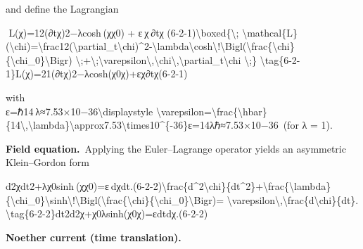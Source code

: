 \documentclass[
]{article}
\begin{document}
and define the Lagrangian

  L(χ)=12(∂tχ)2−λcosh⁡ ⁣(χχ0)  +  ε χ ∂tχ  (6-2-1)\textbackslash boxed\{\textbackslash;
\textbackslash mathcal\{L\}(\textbackslash chi)=\textbackslash frac12(\textbackslash partial\_t\textbackslash chi)\^{}2-\textbackslash lambda\textbackslash cosh\textbackslash!\textbackslash Bigl(\textbackslash frac\{\textbackslash chi\}\{\textbackslash chi\_0\}\textbackslash Bigr)
\textbackslash;+\textbackslash;\textbackslash varepsilon\textbackslash,\textbackslash chi\textbackslash,\textbackslash partial\_t\textbackslash chi
\textbackslash;\}
\textbackslash tag\{6-2-1\}L(χ)=21\hspace{0pt}(∂t\hspace{0pt}χ)2−λcosh(χ0\hspace{0pt}χ\hspace{0pt})+εχ∂t\hspace{0pt}χ\hspace{0pt}(6-2-1)

with\\
ε=ℏ14 λ≈7.53×10−36\textbackslash displaystyle
\textbackslash varepsilon=\textbackslash frac\{\textbackslash hbar\}\{14\textbackslash,\textbackslash lambda\}\textbackslash approx7.53\textbackslash times10\^{}\{-36\}ε=14λℏ\hspace{0pt}≈7.53×10−36 (for
λ = 1).

\textbf{Field equation.} Applying the Euler--Lagrange operator yields an
asymmetric Klein--Gordon form

d2χdt2+λχ0sinh⁡ ⁣(χχ0)=ε dχdt.(6-2-2)\textbackslash frac\{d\^{}2\textbackslash chi\}\{dt\^{}2\}+\textbackslash frac\{\textbackslash lambda\}\{\textbackslash chi\_0\}\textbackslash sinh\textbackslash!\textbackslash Bigl(\textbackslash frac\{\textbackslash chi\}\{\textbackslash chi\_0\}\textbackslash Bigr)=
\textbackslash varepsilon\textbackslash,\textbackslash frac\{d\textbackslash chi\}\{dt\}.
\textbackslash tag\{6-2-2\}dt2d2χ\hspace{0pt}+χ0\hspace{0pt}λ\hspace{0pt}sinh(χ0\hspace{0pt}χ\hspace{0pt})=εdtdχ\hspace{0pt}.(6-2-2)

\textbf{Noether current (time translation).}
\end{document}
